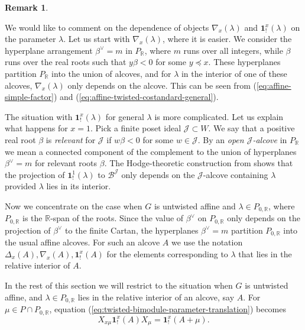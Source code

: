 \documentclass{amsart}
\newcommand{\bone}{\mathbf{1}}
\theoremstyle{definition}
\newtheorem{Rem}[Thm]{Remark}
\numberwithin{equation}{section}
\begin{document}
\begin{Rem}\label{Rem:alcove_dependence}
{ We would like to comment on the dependence of objects $\nabla_x(\lambda)$ and $\bone^x_!(\lambda)$ on the parameter $\lambda$. Let us start with $\nabla_x(\lambda)$, where it is easier. We consider the hyperplane arrangement $\beta^\vee=m$ in $P_{\mathbb{R}}$, where $m$ runs over
all integers, while $\beta$ runs over the real roots such that $y\beta<0$ for some $y\preceq x$.
These hyperplanes partition $P_{\mathbb{R}}$ into the union of alcoves, and for $\lambda$ in the interior of one of these alcoves, $\nabla_x(\lambda)$ only depends on the alcove. This can be seen from (\ref{eq:affine-simple-factor}) and (\ref{eq:affine-twisted-costandard-general}).

The situation with $\bone^x_!(\lambda)$ for general $\lambda$ is more complicated. Let us explain what happens for $x=1$. Pick a finite poset ideal $\mathcal{J}\subset W$. We say that a positive real root $\beta$ is {\it relevant} for $\mathcal{J}$ if $w\beta<0$ for some $w\in \mathcal{J}$. By an {\it open $\mathcal{J}$-alcove} in $P_{\mathbb{R}}$ we mean a connected component of the complement to the union of hyperplanes $\beta^\vee=m$ for relevant roots $\beta$. The Hodge-theoretic construction from \cite{DMB} shows that the projection of $\bone_!^1(\lambda)$ to $\mathcal{B}^{\mathcal{J}}$ only depends on the $\mathcal{J}$-alcove containing $\lambda$ provided $\lambda$ lies in its interior.

Now we concentrate on the case when $G$ is untwisted affine and $\lambda\in P_{0,\mathbb{R}}$, where $P_{0,\mathbb{R}}$ is the $\mathbb{R}$-span of the roots. Since the value of $\beta^\vee$ on $P_{0,\mathbb{R}}$ only depends on the projection of $\beta^\vee$ to the finite Cartan, the hyperplanes $\beta^\vee=m$ partition
$P_{0,\mathbb{R}}$ into the usual affine alcoves.
For such an alcove $A$ we use the notation $\Delta_x(A),\nabla_x(A), \bone^x_!(A)$ for the elements corresponding to $\lambda$ that lies in the relative interior of $A$.}
 \end{Rem}

In the rest of this section we will restrict to the situation when $G$ is untwisted affine, and $\lambda\in P_{0,\mathbb{R}}$ lies in the relative interior of an alcove, say $A$.
 For \(\mu\in P\cap P_{0,\mathbb R}\), equation
 (\ref{eq:twisted-bimodule-parameter-translation}) becomes
 \begin{equation}\label{eq:twisted-bimodule-alcove-translation}
X_{x\mu}\bone_!^x(A)X_{\mu}
=
\bone_!^x(A+\mu).
\end{equation}
\end{document}
